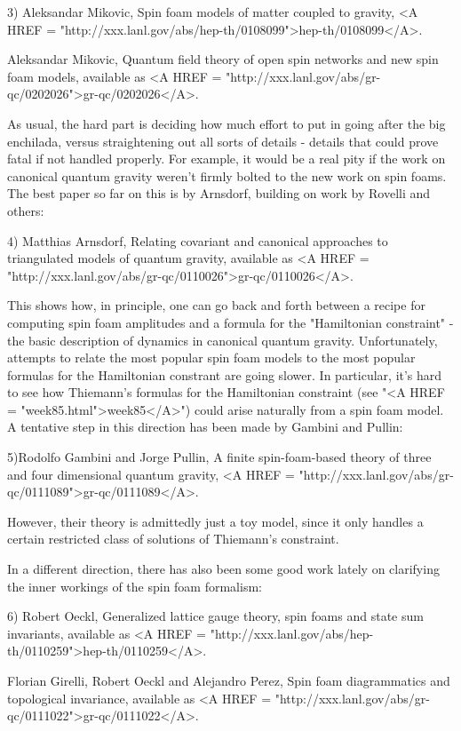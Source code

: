3) Aleksandar Mikovic, Spin foam models of matter coupled to gravity,
<A HREF = "http://xxx.lanl.gov/abs/hep-th/0108099">hep-th/0108099</A>.   

Aleksandar Mikovic, Quantum field theory of open spin networks and new
spin foam models, available as <A HREF =
"http://xxx.lanl.gov/abs/gr-qc/0202026">gr-qc/0202026</A>.

As usual, the hard part is deciding how much effort to put in going
after the big enchilada, versus straightening out all sorts of details -
details that could prove fatal if not handled properly.  For example,
it would be a real pity if the work on canonical quantum gravity weren't
firmly bolted to the new work on spin foams.  The best paper so far on
this is by Arnsdorf, building on work by Rovelli and others:

4) Matthias Arnsdorf, Relating covariant and canonical approaches to
triangulated models of quantum gravity, available as <A HREF = "http://xxx.lanl.gov/abs/gr-qc/0110026">gr-qc/0110026</A>.

This shows how, in principle, one can go back and forth between a recipe
for computing spin foam amplitudes and a formula for the
"Hamiltonian constraint" - the basic description of dynamics
in canonical quantum gravity.  Unfortunately, attempts to relate the
most popular spin foam models to the most popular formulas for the
Hamiltonian constrant are going slower.  In particular, it's hard to see
how Thiemann's formulas for the Hamiltonian constraint (see "<A
HREF = "week85.html">week85</A>") could arise naturally from a spin
foam model.  A tentative step in this direction has been made by Gambini
and Pullin:

5)Rodolfo Gambini and Jorge Pullin, A finite spin-foam-based theory of
three and four dimensional quantum gravity, <A HREF =
"http://xxx.lanl.gov/abs/gr-qc/0111089">gr-qc/0111089</A>.

However, their theory is admittedly just a toy model, since it only
handles a certain restricted class of solutions of Thiemann's constraint.

In a different direction, there has also been some good work lately on
clarifying the inner workings of the spin foam formalism:

6) Robert Oeckl, Generalized lattice gauge theory, spin foams and state
sum invariants, available as <A HREF =
"http://xxx.lanl.gov/abs/hep-th/0110259">hep-th/0110259</A>.

Florian Girelli, Robert Oeckl and Alejandro Perez, Spin foam
diagrammatics and topological invariance, available as <A HREF =
"http://xxx.lanl.gov/abs/gr-qc/0111022">gr-qc/0111022</A>.

